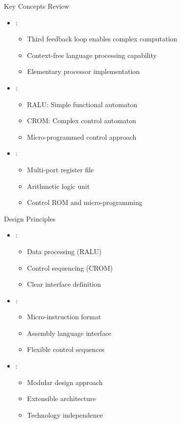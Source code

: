 \begin{frame}{Key Concepts Review}
\begin{itemize}
\item {}:
\begin{itemize}
\item Third feedback loop enables complex computation
\item Context-free language processing capability
\item Elementary processor implementation
\end{itemize}
\vspace{0.3cm}
\item {}:
\begin{itemize}
\item RALU: Simple functional automaton
\item CROM: Complex control automaton
\item Micro-programmed control approach
\end{itemize}
\vspace{0.3cm}
\item {}:
\begin{itemize}
\item Multi-port register file
\item Arithmetic logic unit
\item Control ROM and micro-programming
\end{itemize}
\end{itemize}
\end{frame}

\begin{frame}{Design Principles}
\begin{itemize}
\item {}:
\begin{itemize}
\item Data processing (RALU)
\item Control sequencing (CROM)
\item Clear interface definition
\end{itemize}
\vspace{0.3cm}
\item {}:
\begin{itemize}
\item Micro-instruction format
\item Assembly language interface
\item Flexible control sequences
\end{itemize}
\vspace{0.3cm}
\item {}:
\begin{itemize}
\item Modular design approach
\item Extensible architecture
\item Technology independence
\end{itemize}
\end{itemize}
\end{frame}


